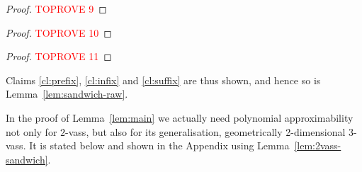 \documentclass[a4paper, UKenglish, cleveref, autoref, thm-restate]{lipics-v2021}
\newcommand{\vass}{{\sc vass}\xspace}
\newcommand{\dvass}{\parvass 2}
\newcommand{\tvass}{\parvass 3}
\newcommand{\geomvass}{geometrically 2-dimensional \tvass}
\newcommand{\parvass}[1]{{$#1$-\vass}\xspace}
\begin{document}
\begin{appendixproof}
\begin{proof}\textcolor{red}{TOPROVE 9}\end{proof}



\begin{proof}\textcolor{red}{TOPROVE 10}\end{proof}



 

\begin{proof}\textcolor{red}{TOPROVE 11}\end{proof}
Claims \ref{cl:prefix}, \ref{cl:infix} and \ref{cl:suffix} are thus shown, and hence so is Lemma~\ref{lem:sandwich-raw}.
\end{appendixproof}
 
In the proof of Lemma~\ref{lem:main} we actually need polynomial approximability not only for \dvass, but also for
its generalisation, \geomvass. It is stated below and shown in the Appendix using Lemma~\ref{lem:2vass-sandwich}.
\end{document}
